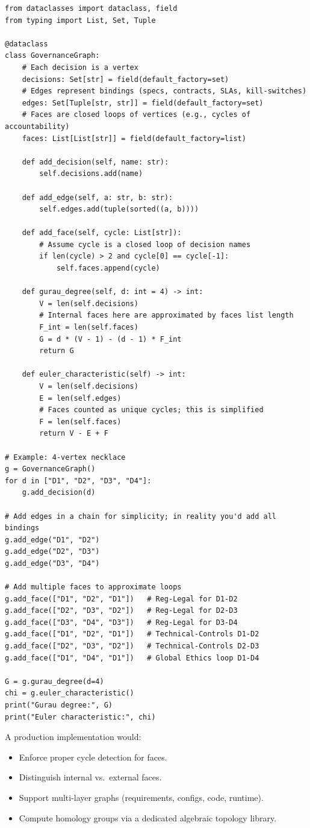 \documentclass[11pt]{article}
\begin{document}
\begin{verbatim}
from dataclasses import dataclass, field
from typing import List, Set, Tuple

@dataclass
class GovernanceGraph:
    # Each decision is a vertex
    decisions: Set[str] = field(default_factory=set)
    # Edges represent bindings (specs, contracts, SLAs, kill-switches)
    edges: Set[Tuple[str, str]] = field(default_factory=set)
    # Faces are closed loops of vertices (e.g., cycles of accountability)
    faces: List[List[str]] = field(default_factory=list)

    def add_decision(self, name: str):
        self.decisions.add(name)

    def add_edge(self, a: str, b: str):
        self.edges.add(tuple(sorted((a, b))))

    def add_face(self, cycle: List[str]):
        # Assume cycle is a closed loop of decision names
        if len(cycle) > 2 and cycle[0] == cycle[-1]:
            self.faces.append(cycle)

    def gurau_degree(self, d: int = 4) -> int:
        V = len(self.decisions)
        # Internal faces here are approximated by faces list length
        F_int = len(self.faces)
        G = d * (V - 1) - (d - 1) * F_int
        return G

    def euler_characteristic(self) -> int:
        V = len(self.decisions)
        E = len(self.edges)
        # Faces counted as unique cycles; this is simplified
        F = len(self.faces)
        return V - E + F

# Example: 4-vertex necklace
g = GovernanceGraph()
for d in ["D1", "D2", "D3", "D4"]:
    g.add_decision(d)

# Add edges in a chain for simplicity; in reality you'd add all bindings
g.add_edge("D1", "D2")
g.add_edge("D2", "D3")
g.add_edge("D3", "D4")

# Add multiple faces to approximate loops
g.add_face(["D1", "D2", "D1"])   # Reg-Legal for D1-D2
g.add_face(["D2", "D3", "D2"])   # Reg-Legal for D2-D3
g.add_face(["D3", "D4", "D3"])   # Reg-Legal for D3-D4
g.add_face(["D1", "D2", "D1"])   # Technical-Controls D1-D2
g.add_face(["D2", "D3", "D2"])   # Technical-Controls D2-D3
g.add_face(["D1", "D4", "D1"])   # Global Ethics loop D1-D4

G = g.gurau_degree(d=4)
chi = g.euler_characteristic()
print("Gurau degree:", G)
print("Euler characteristic:", chi)
\end{verbatim}

A production implementation would:
\begin{itemize}
  \item Enforce proper cycle detection for faces.
  \item Distinguish internal vs.\ external faces.
  \item Support multi-layer graphs (requirements, configs, code, runtime).
  \item Compute homology groups via a dedicated algebraic topology library.
\end{itemize}
\end{document}
